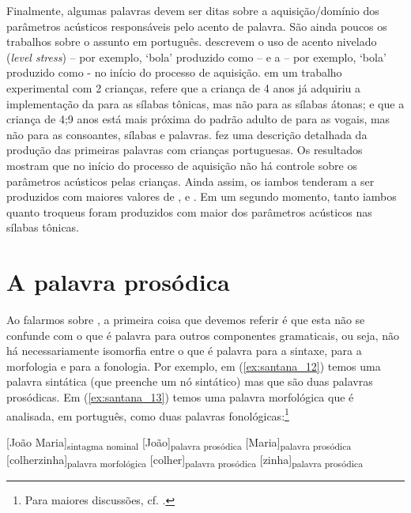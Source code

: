 \documentclass[output=paper]{LSP/langsci}
\begin{document}
Finalmente, algumas palavras devem ser ditas sobre a aquisição/domínio dos parâmetros acústicos responsáveis pelo acento de palavra. São ainda poucos os trabalhos sobre o assunto em português. \citet{frotavigario2008} descrevem o uso de acento nivelado (\textit{level stress}) – por exemplo, `bola' produzido como  – e a  – por exemplo, `bola' produzido como \ipa{[pa\pstr pa]} - no início do processo de aquisição. \citet{gamarossi1999} em um trabalho experimental com 2 crianças, refere que a criança de 4 anos já adquiriu a implementação da  para as sílabas tônicas, mas não para as sílabas átonas; e que a criança de 4;9 anos está mais próxima do padrão adulto de  para as vogais, mas não para as consoantes, sílabas e palavras. \citet{correia2009} fez uma descrição detalhada da produção das primeiras palavras com crianças portuguesas. Os resultados mostram que no início do processo de aquisição não há controle sobre os parâmetros acústicos pelas crianças. Ainda assim, os iambos tenderam a ser produzidos com maiores valores de ,  e . Em um segundo momento, tanto iambos quanto troqueus foram produzidos com maior  dos parâmetros acústicos nas sílabas tônicas.
 
\section{A palavra prosódica}
\label{sec:santana_palavra_prosodica}

Ao falarmos sobre , a primeira coisa que devemos referir é que esta não se confunde com o que é palavra para outros componentes gramaticais, ou seja, não há necessariamente isomorfia entre o que é palavra para a sintaxe, para a morfologia e para a fonologia. Por exemplo, em (\ref{ex:santana_12}) temos uma palavra sintática (que preenche um nó sintático) mas que são duas palavras prosódicas. Em (\ref{ex:santana_13}) temos uma palavra morfológica que é analisada, em português, como duas palavras fonológicas:\footnote{Para maiores discussões, cf. \citealt{mateusdandrade2000}.}

\ea\label{ex:santana_12}
[João Maria]\textsubscript{sintagma nominal} [João]\textsubscript{palavra prosódica} [Maria]\textsubscript{palavra prosódica}
\z
\ea\label{ex:santana_13}
[colherzinha]\textsubscript{palavra morfológica} [colher]\textsubscript{palavra prosódica} [zinha]\textsubscript{palavra prosódica}
\z
\end{document}
